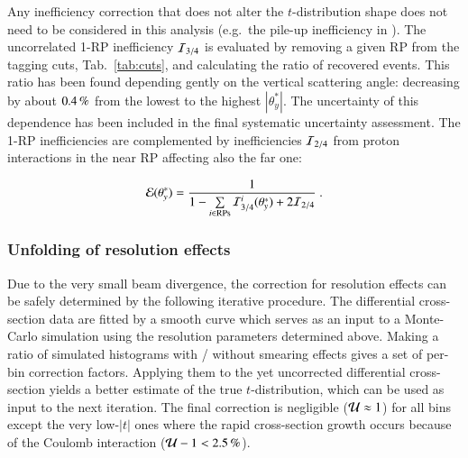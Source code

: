 Any inefficiency correction that does not alter the $t$-distribution shape does not need to be considered in this analysis (e.g.~the pile-up inefficiency in \cite{prl111}). The uncorrelated 1-RP inefficiency ${\cal I}_{3/4}$ is evaluated by removing a given RP from the tagging cuts, Tab.~\ref{tab:cuts}, and calculating the ratio of recovered events. This ratio has been found depending gently on the vertical scattering angle: decreasing by about $0.4\,{\rm \%}$ from the lowest to the highest $|\theta_y^*|$. The uncertainty of this dependence has been included in the final systematic uncertainty assessment. The 1-RP inefficiencies are complemented by inefficiencies ${\cal I}_{2/4}$ from proton interactions in the near RP affecting also the far one:

\begin{equation}
\label{efficiency}
	{\cal E}(\theta_y^*) = {1\over 1 - \sum\limits_{i\in \rm RPs} {\cal I}^i_{3/4}(\theta_y^*) + 2 {\cal I}_{2/4} } \ .
\end{equation}

\subsubsection{Unfolding of resolution effects}

Due to the very small beam divergence, the correction for resolution effects can be safely determined by the following iterative procedure. The differential cross-section data are fitted by a smooth curve which serves as an input to a Monte-Carlo simulation using the resolution parameters determined above. Making a ratio of simulated histograms with / without smearing effects gives a set of per-bin correction factors. Applying them to the yet uncorrected differential cross-section yields a better estimate of the true $t$-distribution, which can be used as input to the next iteration. The final correction is negligible (${\cal U} \approx 1$) for all bins except the very low-$|t|$ ones where the rapid cross-section growth occurs because of the Coulomb interaction ($ {\cal U} - 1 < 2.5\un{\%}$).

